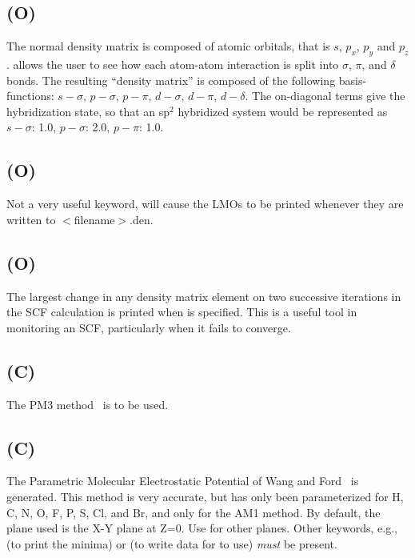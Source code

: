 \subsection*{ (O)}
        The normal density matrix is composed of atomic orbitals, that is $s$,
   $p_x$,  $p_y$ and $p_z$.   allows the user to see how each atom-atom interaction
   is split into $\sigma$, $\pi$, and $\delta$ bonds. The
resulting ``density  matrix'' is
   composed  of  the  following  basis-functions:
   $s-\sigma$,  $p-\sigma$, $p-\pi$, $d-\sigma$, $d-\pi$, $d-\delta$.
   The on-diagonal  terms  give  the  hybridization
   state,  so  that an sp$^2$ hybridized system would be represented as
   $s-\sigma$: 1.0, $p-\sigma$: 2.0, $p-\pi$: 1{.}0.

\subsection*{ (O)}
Not a very useful keyword,  will cause the LMOs to be printed
whenever they are written to $<\!$filename$\!>$.den.

\subsection*{ (O)}
The largest change in any density matrix element on two successive iterations
in the SCF calculation is printed when  is specified.  This is a useful
tool in monitoring an SCF, particularly when it fails to converge.

\subsection*{ (C)}
The PM3 method~\cite{pm3-1} is to be used.

\subsection*{ (C)}
\label{pmep}
The Parametric Molecular Electrostatic Potential of Wang and Ford~\cite{pmep1,pmep2}
is generated. This method is very accurate, but has only been parameterized
for H, C, N, O, F, P, S, Cl, and Br, and only for the AM1 method.
By default, the plane used is the X-Y plane at Z=0. Use 
for other planes.  Other keywords, e.g.,  (to print the minima) or
 (to write data for  to use) {\em must}
be present.


